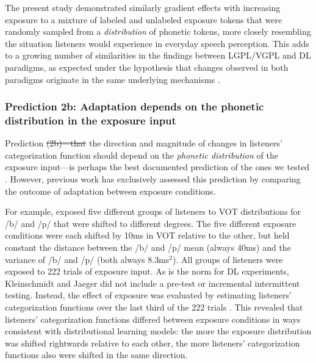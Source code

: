 \documentclass[
  11pt,
  man,mask,floatsintext]{apa6}
\makeatletter
\providecommand{\DIFadd}[1]{{\protect\color{blue}\uwave{#1}}} %
\providecommand{\DIFdel}[1]{{\protect\color{red}\sout{#1}}} %
\providecommand{\DIFaddbegin}{} %
\providecommand{\DIFaddend}{} %
\providecommand{\DIFdelbegin}{} %
\providecommand{\DIFdelend}{} %
\newcommand{\DIFscaledelfig}{0.5}
\newlength{\DIFdelgraphicswidth} %
\newlength{\DIFdelgraphicsheight} %
\newcommand{\DIFaddincludegraphics}[2][]{{\color{blue}\fbox{\DIFOincludegraphics[#1]{#2}}}} %
\newcommand{\DIFdelincludegraphics}[2][]{%
\sbox{\DIFdelgraphicsbox}{\DIFOincludegraphics[#1]{#2}}%
\settoboxwidth{\DIFdelgraphicswidth}{\DIFdelgraphicsbox} %
\settoboxtotalheight{\DIFdelgraphicsheight}{\DIFdelgraphicsbox} %
\scalebox{\DIFscaledelfig}{%
\parbox[b]{\DIFdelgraphicswidth}{\usebox{\DIFdelgraphicsbox}\\[-\baselineskip] \rule{\DIFdelgraphicswidth}{0em}}\llap{\resizebox{\DIFdelgraphicswidth}{\DIFdelgraphicsheight}{%
\setlength{\unitlength}{\DIFdelgraphicswidth}%
\begin{picture}(1,1)%
\thicklines\linethickness{2pt} %
{\color[rgb]{1,0,0}\put(0,0){\framebox(1,1){}}}%
{\color[rgb]{1,0,0}\put(0,0){\line( 1,1){1}}}%
{\color[rgb]{1,0,0}\put(0,1){\line(1,-1){1}}}%
\end{picture}%
}\hspace*{3pt}}} %
} %
\DeclareRobustCommand{\DIFaddbegin}{\DIFOaddbegin \let\includegraphics\DIFaddincludegraphics} %
\DeclareRobustCommand{\DIFaddend}{\DIFOaddend \let\includegraphics\DIFOincludegraphics} %
\DeclareRobustCommand{\DIFdelbegin}{\DIFOdelbegin \let\includegraphics\DIFdelincludegraphics} %
\DeclareRobustCommand{\DIFdelend}{\DIFOaddend \let\includegraphics\DIFOincludegraphics} %
\let\sout@orig\sout %
\renewcommand{\sout}[1]{\ifmmode\text{\sout@orig{\ensuremath{#1}}}\else\sout@orig{#1}\fi} %
\makeatother
\begin{document}
The present study demonstrated similarly gradient effects with increasing exposure to a mixture of labeled and unlabeled exposure tokens that were randomly sampled from a \emph{distribution} of phonetic tokens, more closely resembling the situation listeners would experience in everyday speech perception. This adds to a growing number of similarities in the findings between LGPL/VGPL and DL paradigms, as expected under the hypothesis that changes observed in both paradigms originate in the same underlying mechanisms \autocites[see discussions in][]{kleinschmidt2015,zheng-samuel2020,xie2023}.

\subsubsection{Prediction 2b: Adaptation depends on the phonetic distribution in the exposure input}\label{prediction-2b-adaptation-depends-on-the-phonetic-distribution-in-the-exposure-input}

Prediction \DIFdelbegin \DIFdel{(2b)---that }\DIFdelend \DIFaddbegin \DIFadd{2b---that }\DIFaddend the direction and magnitude of changes in listeners' categorization function should depend on the \emph{phonetic distribution} of the exposure input---is perhaps the best documented prediction of the ones we tested \autocite{bejjanki2011,chladkova2017,clayards2008,colby2018,kleinschmidt-jaeger2011,kleinschmidt-jaeger2012,kleinschmidt-jaeger2016,nixon2016,saltzman-myers2021,theodore-monto2019}. However, previous work has exclusively assessed this prediction by comparing the outcome of adaptation between exposure conditions.

For example, \textcite{kleinschmidt-jaeger2016} exposed five different groups of listeners to VOT distributions for /b/ and /p/ that were shifted to different degrees. The five different exposure conditions were each shifted by 10ms in VOT relative to the other, but held constant the distance between the /b/ and /p/ mean (always 40ms) and the variance of /b/ and /p/ (both always 8.3ms\(^2\)). All groups of listeners were exposed to 222 trials of exposure input. As is the norm for DL experiments, Kleinschmidt and Jaeger did not include a pre-test or incremental intermittent testing. Instead, the effect of exposure was evaluated by estimating listeners' categorization functions over the last third of the 222 trials \autocites[another common approach is to average over \emph{all} trials, e.g.,][]{clayards2008,nixon2016}. This revealed that listeners' categorization functions differed between exposure conditions in ways consistent with distributional learning models: the more the exposure distribution was shifted rightwards relative to each other, the more listeners' categorization functions also were shifted in the same direction.
\end{document}
